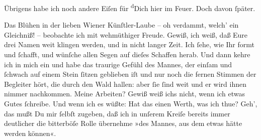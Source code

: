 \pstart
           Übrigens habe ich noch andere Eiſen für \substVorne{}\textsuperscript{d}\substDazwischen{}D\substHinten{}ich hier im Feuer. Doch davon{ }ſpäter.\pend
           
\pstart
           Das Blühen in der lieben Wiener Künſtler-Laube –
               oh verdammt, welch’ ein Gleichniß! – beobachte ich mit wehmüthiger Freude. Gewiß, ich
               weiß, daß Eure drei Namen weit klingen werden, und in nicht langer Zeit. Ich{ }ſehe, wie
                  Ihr formt und{ }ſchafft, und wünſche allen Segen {\pb}auf dieſes Schaffen herab. Und dann kehre ich in
               mich ein und habe das traurige Gefühl des Mannes, der einſam und{ }ſchwach auf einem
               Stein{ }ſitzen geblieben iſt und nur noch die fernen Stimmen der Begleiter hört, die
               durch den Wald hallen: aber{ }ſie{ }ſind weit und er wird ihnen nimmer nachkommen. Meine
               Arbeiten? Gewiß weiß ichs nicht, wenn ich etwas Gutes{ }ſchreibe. Und wenn ich es
               wüßte: Hat das einen Werth, was ich thue? Geh’, das mußt {\pb}Du mir{ }ſelbſt zugeben, daß ich in unſerem Kreiſe
               bereits immer deutlicher die bitterböſe Rolle übernehme »des Mannes, aus dem etwas
               hätte werden können«.\pend
           
